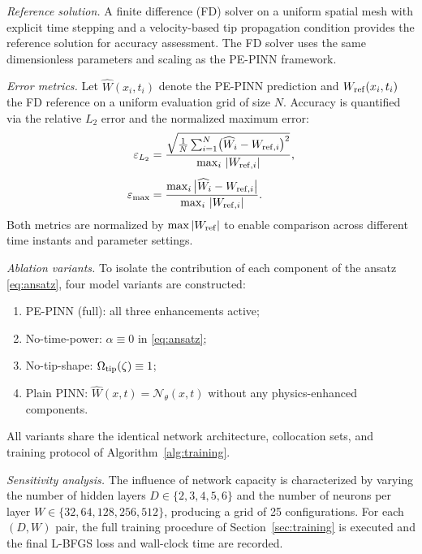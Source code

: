 \documentclass[a4paper,fleqn]{cas-sc}
\begin{document}
\medskip
\noindent\textit{Reference solution.}
A finite difference (FD) solver on a uniform spatial mesh with
explicit time stepping and a velocity-based tip propagation
condition \cite{Nordgren1972} provides the reference solution for
accuracy assessment. The FD solver uses the same dimensionless
parameters and scaling as the PE-PINN framework.

\medskip
\noindent\textit{Error metrics.}
Let $\widehat{W}(x_i, t_i)$ denote the PE-PINN prediction and
$W_{\rm ref}(x_i, t_i)$ the FD reference on a uniform evaluation
grid of size $N$. Accuracy is quantified via the relative $L_2$
error and the normalized maximum error:
\begin{align}
  \varepsilon_{L_2}
  &= \frac{\sqrt{\frac{1}{N}\sum_{i=1}^{N}
      \bigl(\widehat{W}_i - W_{{\rm ref},i}\bigr)^{2}}}
         {\max_{i}\,|W_{{\rm ref},i}|},
  \label{eq:l2-error} \\[4pt]
  \varepsilon_{\max}
  &= \frac{\max_{i}\,\bigl|\widehat{W}_i
      - W_{{\rm ref},i}\bigr|}
         {\max_{i}\,|W_{{\rm ref},i}|}.
  \label{eq:max-error}
\end{align}
Both metrics are normalized by $\max|W_{\rm ref}|$ to enable
comparison across different time instants and parameter settings.

\medskip
\noindent\textit{Ablation variants.}
To isolate the contribution of each component of the ansatz
\eqref{eq:ansatz}, four model variants are constructed:
\begin{enumerate}
  \item[(i)] PE-PINN (full): all three enhancements active;
  \item[(ii)] No-time-power: $\alpha \equiv 0$ in \eqref{eq:ansatz};
  \item[(iii)] No-tip-shape: $\Omega_{\rm tip}(\zeta) \equiv 1$;
  \item[(iv)] Plain PINN: $\widehat{W}(x,t) = \mathcal{N}_{\theta}(x,t)$
    without any physics-enhanced components.
\end{enumerate}
All variants share the identical network architecture, collocation
sets, and training protocol of Algorithm~\ref{alg:training}.

\medskip
\noindent\textit{Sensitivity analysis.}
The influence of network capacity is characterized by varying the
number of hidden layers $D \in \{2, 3, 4, 5, 6\}$ and the number of
neurons per layer $W \in \{32, 64, 128, 256, 512\}$, producing a
grid of 25 configurations. For each $(D, W)$ pair, the full training
procedure of Section~\ref{sec:training} is executed and the final
L-BFGS loss and wall-clock time are recorded.
\end{document}

